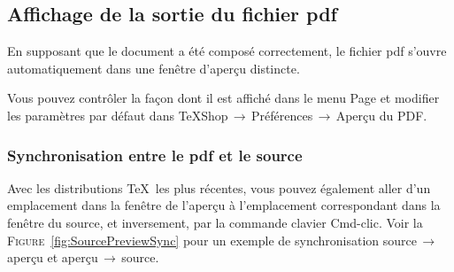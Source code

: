 \documentclass[11pt,french]{article}
\newcommand{\acr}[1]{\textsf{#1}}
\newcommand{\cmd}[1]{\textsf{#1}}
\newcommand{\mnu}[1]{\textsf{#1}}
\newcommand{\To}{\,\(\to\)\,}
\begin{document}
\subsection{Affichage de la sortie du fichier \acr{pdf}}

En supposant que le document a été composé correctement, le fichier \acr{pdf} s'ouvre automatiquement dans une fenêtre d'aperçu distincte.

Vous pouvez contrôler la façon dont il est affiché dans le menu \mnu{Page} et modifier les paramètres par défaut dans \mnu{TeXShop}\To\mnu{Préférences}\To\mnu{Aperçu du PDF}.

%


\subsubsection{Synchronisation entre le \acr{pdf} et le source}

Avec les distributions \TeX\ les plus récentes, vous pouvez également aller d'un emplacement dans la fenêtre de l'aperçu à l'emplacement correspondant dans la fenêtre du source, et inversement, par la commande clavier \cmd{Cmd-clic}. Voir la \textsc{Figure}~\ref{fig:SourcePreviewSync} pour un exemple de synchronisation source\To aperçu et aperçu\To source.

\end{document}
